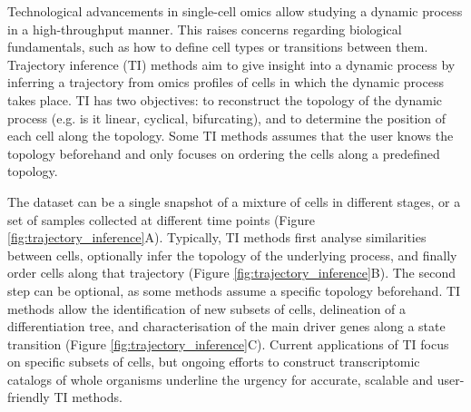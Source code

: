 Technological advancements in single-cell omics allow studying a dynamic process in a high-throughput manner. 
This raises concerns regarding biological fundamentals, such as how to define cell types or transitions between them\cite{etzrodt_quantitativesinglecellapproaches_2014,tanay_scalingsinglecellgenomics_2017}. 
Trajectory inference (TI) methods aim to give insight into a dynamic process by inferring a trajectory from omics profiles of cells in which the dynamic process takes place\cite{cannoodt_computationalmethodstrajectory_2016}. 
TI has two objectives: to reconstruct the topology of the dynamic process (e.g. is it linear, cyclical, bifurcating), and to determine the position of each cell along the topology. Some TI methods assumes that the user knows the topology beforehand and only focuses on ordering the cells along a predefined topology.

The dataset can be a single snapshot of a mixture of cells in different stages, or a set of samples collected at different time points (Figure \ref{fig:trajectory_inference}A). Typically, TI methods first analyse similarities between cells, optionally infer the topology of the underlying process, and finally order cells along that trajectory (Figure \ref{fig:trajectory_inference}B). The second step can be optional, as some methods assume a specific topology beforehand.
TI methods allow the identification of new subsets of cells, delineation of a differentiation tree, and characterisation of the main driver genes along a state transition (Figure \ref{fig:trajectory_inference}C). Current applications of TI focus on specific subsets of cells, but ongoing efforts to construct transcriptomic catalogs of whole organisms\cite{regev_humancellatlas_2017,han_mappingmousecell_2018,schaum_singlecelltranscriptomics20_2018} underline the urgency for accurate, scalable\cite{aibar_scenicsinglecellregulatory_2017,angerer_singlecellsmake_2017} and user-friendly TI methods.

